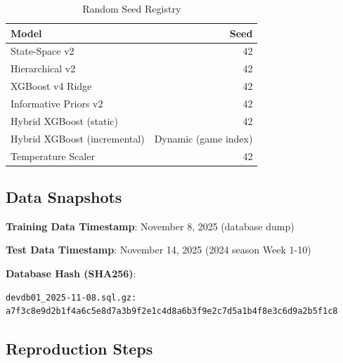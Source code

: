 \begin{table}[htbp]
\centering
\caption{Random Seed Registry}
\label{tab:random-seeds}
\begin{tabular}{lr}
\toprule
\textbf{Model} & \textbf{Seed} \\
\midrule
State-Space v2 & 42 \\
Hierarchical v2 & 42 \\
XGBoost v4 Ridge & 42 \\
Informative Priors v2 & 42 \\
Hybrid XGBoost (static) & 42 \\
Hybrid XGBoost (incremental) & Dynamic (game index) \\
Temperature Scaler & 42 \\
\bottomrule
\end{tabular}
\end{table}

\subsection{Data Snapshots}

\textbf{Training Data Timestamp}: November 8, 2025 (database dump)

\textbf{Test Data Timestamp}: November 14, 2025 (2024 season Week 1-10)

\textbf{Database Hash (SHA256)}:
\begin{verbatim}
devdb01_2025-11-08.sql.gz:
a7f3c8e9d2b1f4a6c5e8d7a3b9f2e1c4d8a6b3f9e2c7d5a1b4f8e3c6d9a2b5f1c8
\end{verbatim}

\subsection{Reproduction Steps}

